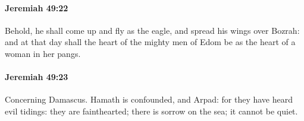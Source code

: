 		\paragraph{Jeremiah 49:22} %
			\label{JEREMIAH-49-22}

			Behold, he shall come up and fly as the eagle, and spread his wings over Bozrah: and at that day shall the heart of the mighty men of Edom be as the heart of a woman in her pangs.


		\paragraph{Jeremiah 49:23} %
			\label{JEREMIAH-49-23}

			Concerning Damascus. Hamath is confounded, and Arpad: for they have heard evil tidings: they are fainthearted; there is sorrow on the sea; it cannot be quiet.


